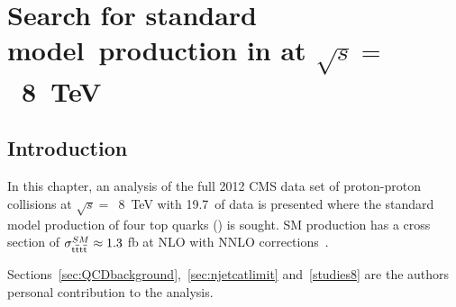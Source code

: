 \chapter{Search for standard model~\tttt production in \runone at $\sqrt{s} =$~8~TeV }
\label{c:Run1}

\section{Introduction}
In this chapter, an analysis of the full 2012 CMS data set of proton-proton collisions at $\sqrt{s} =$~8~TeV with 19.7~\fbinv of data is presented where the standard model production of four top quarks (\tttt) is sought. SM \tttt production has a cross section of $\sigma_{{\mathrm{t}\overline{\mathrm{t}}\mathrm{t}\overline{\mathrm{t}}}}^{SM}  \approx 1.3$ fb at NLO with NNLO corrections~\cite{Barger201070,Bevilacqua2012}. 



Sections~\ref{sec:QCDbackground},~\ref{sec:njetcatlimit} and~\ref{studies8} are the authors personal contribution to the analysis.

